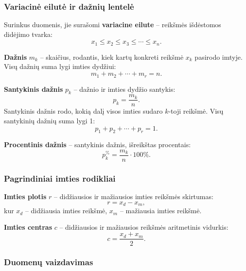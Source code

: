 \subsubsection*{Variacinė eilutė ir dažnių lentelė}

Surinkus duomenis, jie surašomi \textbf{variacine eilute} – reikšmės išdėstomos
didėjimo tvarka:
\[
  x_1 \leq x_2 \leq x_3 \leq \cdots \leq x_n.
\]

\begin{definition}[Dažnis]
\textbf{Dažnis} $m_k$ – skaičius, rodantis, kiek kartų konkreti reikšmė $x_k$
pasirodo imtyje. Visų dažnių suma lygi imties dydžiui:
\[
  m_1 + m_2 + \cdots + m_r = n.
\]
\end{definition}

\begin{definition}
\textbf{Santykinis dažnis} $p_k$ – dažnio ir imties dydžio santykis:
\[
  p_k = \frac{m_k}{n}.
\]
Santykinis dažnis rodo, kokią dalį visos imties sudaro $k$-toji reikšmė.
Visų santykinių dažnių suma lygi 1:
\[
  p_1 + p_2 + \cdots + p_r = 1.
\]
\end{definition}

\begin{definition}
\textbf{Procentinis dažnis} – santykinis dažnis, išreikštas procentais:
\[
  p_k^{\%} = \frac{m_k}{n} \cdot 100\%.
\]
\end{definition}

\subsubsection*{Pagrindiniai imties rodikliai}

\begin{definition}
\textbf{Imties plotis} $r$ – didžiausios ir mažiausios imties reikšmės skirtumas:
\[
  r = x_d - x_m,
\]
kur $x_d$ – didžiausia imties reikšmė, $x_m$ – mažiausia imties reikšmė.
\end{definition}

\begin{definition}
\textbf{Imties centras} $c$ – didžiausios ir mažiausios reikšmės aritmetinis vidurkis:
\[
  c = \frac{x_d + x_m}{2}.
\]
\end{definition}

\subsubsection*{Duomenų vaizdavimas}

